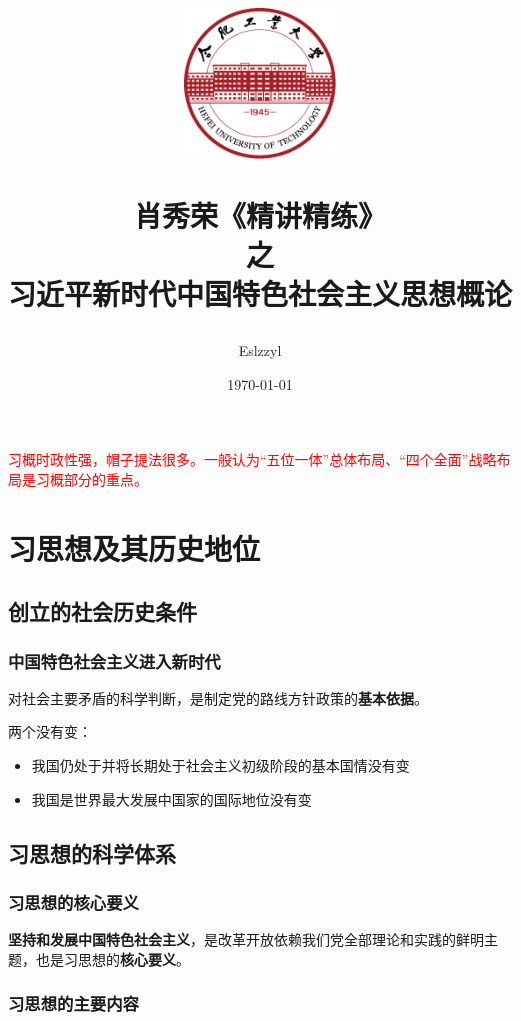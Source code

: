\documentclass[12pt, a4paper, oneside]{ctexart}
\title{
    \includegraphics[width=0.3\textwidth]{../../../share/images/hfut-badge.pdf}
    
    \vspace{20pt}
    肖秀荣《精讲精练》\\ 之 \\ 习近平新时代中国特色社会主义思想概论
}
\author{Eslzzyl}
\date{\today}
\begin{document}
\maketitle
\newpage
\tableofcontents
\vspace{20pt}

\textcolor{red}{习概时政性强，帽子提法很多。一般认为“五位一体”总体布局、“四个全面”战略布局是习概部分的重点。}

\newpage

\section{习思想及其历史地位}

\subsection{创立的社会历史条件}

\subsubsection{中国特色社会主义进入新时代}

对社会主要矛盾的科学判断，是制定党的路线方针政策的\textbf{基本依据}。

\vspace*{10pt}

两个没有变：
\begin{itemize}
  \item 我国仍处于并将长期处于社会主义初级阶段的基本国情没有变
  \item 我国是世界最大发展中国家的国际地位没有变
\end{itemize}

\subsection{习思想的科学体系}

\subsubsection{习思想的核心要义}

\textbf{坚持和发展中国特色社会主义}，是改革开放依赖我们党全部理论和实践的鲜明主题，也是习思想的\textbf{核心要义}。

\subsubsection{习思想的主要内容}
\end{document}
